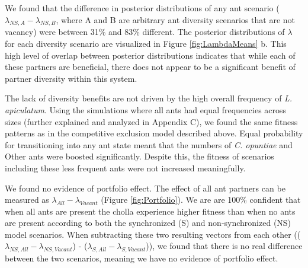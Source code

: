 \documentclass[11pt]{article}
\begin{document}
We found that the difference in posterior distributions of any ant scenario ($\lambda_{NS,A} - \lambda_{NS,B}$, where A and B are arbitrary ant diversity scenarios that are not vacancy) were between 31\% and 83\% different.
The posterior distributions of $\lambda$ for each diversity scenario are visualized in Figure \ref{fig:LambdaMeans} b.
This high level of overlap between posterior distributions indicates that while each of these partners are beneficial, there does not appear to be a significant benefit of partner diversity within this system.

The lack of diversity benefits are not driven by the high overall frequency of \textit{L. apiculatum}. 
Using the simulations where all ants had equal frequencies across sizes (further explained and analyzed in Appendix C), we found the same fitness patterns as in the competitive exclusion model described above.
Equal probability for transitioning into any ant state meant that the numbers of \textit{C. opuntiae} and Other ants were boosted significantly.
Despite this, the fitness of scenarios including these less frequent ants were not increased meaningfully.

We found no evidence of portfolio effect.
The effect of all ant partners can be measured as $\lambda_{All} - \lambda_{Vacant}$ (Figure \ref{fig:Portfolio}).
We are are 100\% confident that when all ants are present the cholla experience higher fitness than when no ants are present according to both the synchronized (S) and non-synchronized (NS) model scenarios. 
When subtracting these two resulting vectors from each other (($\lambda_{NS,All} - \lambda_{NS,Vacant}$) - ($\lambda_{S,All} - \lambda_{S,Vacant}$)), we found that there is no real difference between the two scenarios, meaning we have no evidence of portfolio effect.
\end{document}
